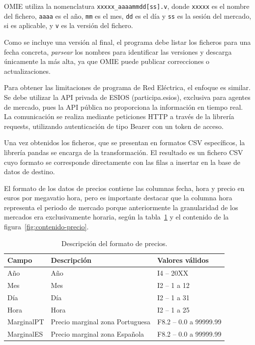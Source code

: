 OMIE utiliza la nomenclatura \texttt{xxxxx\_aaaammdd[ss].v}, donde \texttt{xxxxx} es el nombre del fichero, \texttt{aaaa} es el año, \texttt{mm} es el mes, \texttt{dd} es el día y \texttt{ss} es la sesión del mercado, si es aplicable, y \texttt{v} es la versión del fichero.

Como se incluye una versión al final, el programa debe listar los ficheros para una fecha concreta, \textit{parsear} los nombres para identificar las versiones y descarga únicamente la más alta, ya que OMIE puede publicar correcciones o actualizaciones.

Para obtener las limitaciones de programa de Red Eléctrica, el enfoque es similar. Se debe utilizar la API privada de ESIOS (participa.esios), exclusiva para agentes de mercado, pues la API pública no proporciona la información en tiempo real. La comunicación se realiza mediante peticiones HTTP a través de la librería requests, utilizando autenticación de tipo Bearer con un token de acceso.

Una vez obtenidos los ficheros, que se presentan en formatos CSV específicos, la librería pandas se encarga de la transformación. El resultado es un fichero CSV cuyo formato se corresponde directamente con las filas a insertar en la base de datos de destino.

El formato de los datos de precios contiene las columnas fecha, hora y precio en euros por megavatio hora, pero es importante destacar que la columna hora representa el periodo de mercado porque anteriormente la granularidad de los mercados era exclusivamente horaria, según la tabla~\ref{tab:descripción-precio} y el contenido de la figura~\ref{fig:contenido-precio}.

\begin{table}[ht]
  \centering
  \begin{tabular}{|l|p{7.5cm}|l|}
    \hline
    Campo & Descripción & Valores válidos\\
    \hline
    Año & Año & I4 -- 20XX\\
    Mes & Mes & I2 -- 1 a 12\\
    Día & Día & I2 -- 1 a 31\\
    Hora & Hora & I2 -- 1 a 25\\
    MarginalPT & Precio marginal zona Portuguesa & F8.2 -- 0.0 a 99999.99\\
    MarginalES & Precio marginal zona Española & F8.2 -- 0.0 a 99999.99\\
    \hline
  \end{tabular}
  \caption{Descripción del formato de precios.}
  \label{tab:descripción-precio}
\end{table}

